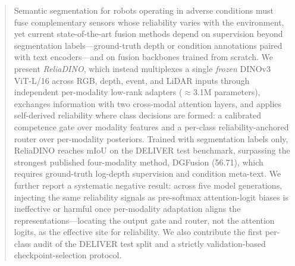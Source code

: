 
\begin{abstract}
Semantic segmentation for robots operating in adverse conditions must fuse complementary sensors whose reliability varies with the environment, yet current state-of-the-art fusion methods depend on supervision beyond segmentation labels---ground-truth depth or condition annotations paired with text encoders---and on fusion backbones trained from scratch. We present \emph{ReliaDINO}, which instead multiplexes a single \emph{frozen} DINOv3 ViT-L/16 across RGB, depth, event, and LiDAR inputs through independent per-modality low-rank adapters ($\approx$3.1M parameters), exchanges information with two cross-modal attention layers, and applies self-derived reliability where class decisions are formed: a calibrated competence gate over modality features and a per-class reliability-anchored router over per-modality posteriors. Trained with segmentation labels only, ReliaDINO reaches  mIoU on the DELIVER test benchmark, surpassing the strongest published four-modality method, DGFusion (56.71), which requires ground-truth log-depth supervision and condition meta-text. We further report a systematic negative result: across five model generations, injecting the same reliability signals as pre-softmax attention-logit biases is ineffective or harmful once per-modality adaptation aligns the representations---locating the output gate and router, not the attention logits, as the effective site for reliability. We also contribute the first per-class audit of the DELIVER test split and a strictly validation-based checkpoint-selection protocol.
\end{abstract}

